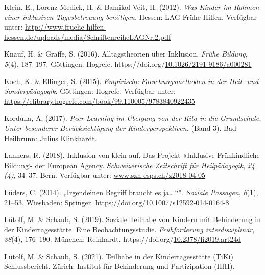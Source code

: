\documentclass[
  ngerman,
  11pt,
  paper=a4,
  twoside,
  titlepage=true,
  openright,
  abstract=on,
  toc=listofnumbered,
  numbers=noenddot,
  chapterprefix=true,
  headings=optiontohead,
  svgnames,
  dvipsnames]{scrreprt}
\newlength{\cslhangindent}
\newlength{\cslentryspacingunit} %
\newenvironment{CSLReferences}[2] %
 {%
  \setlength{\parindent}{0pt}
  \ifodd #1
  \let\oldpar\par
  \def\par{\hangindent=\cslhangindent\oldpar}
  \fi
  \setlength{\parskip}{#2\cslentryspacingunit}
 }%
 {}
\begin{document}
\begin{CSLReferences}{1}{0}
\leavevmode{}%
Klein, E., Lorenz-Medick, H. \& Bamikol-Veit, H. (2012). \emph{Was
Kinder im Rahmen einer inklusiven Tagesbetreuung benötigen.} Hessen: LAG
Frühe Hilfen. Verfügbar unter:
\url{http://www.fruehe-hilfen-hessen.de/uploads/media/SchriftenreiheLAGNr.2.pdf}

\leavevmode{}%
Knauf, H. \& Graffe, S. (2016). Alltagstheorien über Inklusion.
\emph{Frühe Bildung}, \emph{5}(4), 187–197. Göttingen: Hogrefe.
https://doi.org/\href{https://doi.org/10.1026/2191-9186/a000281}{10.1026/2191-9186/a000281}

\leavevmode{}%
Koch, K. \& Ellinger, S. (2015). \emph{Empirische Forschungsmethoden in
der Heil- und Sonderpädagogik.} Göttingen: Hogrefe. Verfügbar unter:
\url{https://elibrary.hogrefe.com/book/99.110005/9783840922435}

\leavevmode{}%
Kordulla, A. (2017). \emph{Peer-Learning im Übergang von der Kita in die
Grundschule. Unter besonderer Berücksichtigung der Kinderperspektiven.}
(Band 3). Bad Heilbrunn: Julius Klinkhardt.

\leavevmode{}%
Lanners, R. (2018). Inklusion von klein auf. Das Projekt «Inklusive
Frühkindliche Bildung» der European Agency. \emph{Schweizerische
Zeitschrift für Heilpädagogik}, \emph{24 (4)}, 34–37. Bern. Verfügbar
unter:
\href{https://www.szh-csps.ch/z2018-04-05}{www.szh-csps.ch/z2018-04-05}

\leavevmode{}%
Lüders, C. (2014). „{Irgendeinen} {Begriff} braucht es ja….“*.
\emph{Soziale Passagen}, \emph{6}(1), 21–53. Wiesbaden: Springer.
https://doi.org/\href{https://doi.org/10.1007/s12592-014-0164-8}{10.1007/s12592-014-0164-8}

\leavevmode{}%
Lütolf, M. \& Schaub, S. (2019). Soziale Teilhabe von Kindern mit
Behinderung in der Kindertagesst{ä}tte. Eine Beobachtungsstudie.
\emph{Fr{ü}hf{ö}rderung interdisziplin{ä}r}, \emph{38}(4), 176–190.
München: Reinhardt.
https://doi.org/\href{https://doi.org/10.2378/fi2019.art24d}{10.2378/fi2019.art24d}

\leavevmode{}%
Lütolf, M. \& Schaub, S. (2021). Teilhabe in der Kindertagesstätte
(TiKi) Schlussbericht. Zürich: Institut für Behinderung und
Partizipation (HfH).


\end{CSLReferences}
\end{document}
